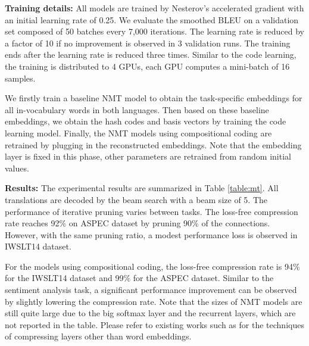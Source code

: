 \documentclass{article} %
\begin{document}
{\bf Training details:} \: All models are trained by Nesterov's accelerated gradient \citep{nesterov1983method} with an initial learning rate of 0.25. We evaluate the smoothed BLEU \citep{smoothed_bleu} on a validation set composed of 50 batches every 7,000 iterations. The learning rate is reduced by a factor of 10 if no improvement is observed in 3 validation runs. The training ends after the learning rate is reduced three times. Similar to the code learning, the training is distributed to 4 GPUs, each GPU computes a mini-batch of 16 samples.

We firstly train a baseline NMT model to obtain the task-specific embeddings for all in-vocabulary words in both languages. Then based on these baseline embeddings, we obtain the hash codes and basis vectors by training the code learning model. Finally, the NMT models using compositional coding are retrained by plugging in the reconstructed embeddings. Note that the embedding layer is fixed in this phase, other parameters are retrained from random initial values.

{\bf Results:} \: The experimental results are summarized in Table \ref{table:mt}. All translations are decoded by the beam search with a beam size of 5. The performance of iterative pruning varies between tasks. The loss-free compression rate reaches 92\% on ASPEC dataset by pruning 90\% of the connections. However, with the same pruning ratio, a modest performance loss is observed in IWSLT14 dataset.


For the models using compositional coding, the loss-free compression rate is 94\% for the IWSLT14 dataset and 99\% for the ASPEC dataset. Similar to the sentiment analysis task, a significant performance improvement can be observed by slightly lowering the compression rate. Note that the sizes of NMT models are still quite large due to the big softmax layer and the recurrent layers, which are not reported in the table. Please refer to existing works such as \citet{Zhang2017TowardsCA} for the techniques of compressing layers other than word embeddings. 

\end{document}
